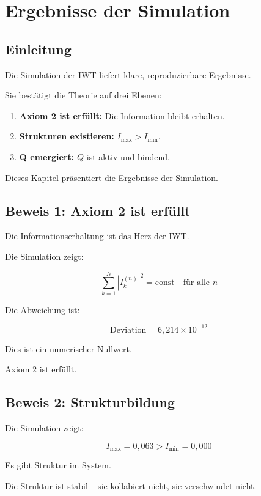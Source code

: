 \chapter{Ergebnisse der Simulation}

\section{Einleitung}

Die Simulation der IWT liefert klare, reproduzierbare Ergebnisse.

Sie bestätigt die Theorie auf drei Ebenen:

\begin{enumerate}
\item \textbf{Axiom 2 ist erfüllt:} Die Information bleibt erhalten.
\item \textbf{Strukturen existieren:} \( I_{\text{max}} > I_{\text{min}} \).
\item \textbf{Q emergiert:} \( Q \) ist aktiv und bindend.
\end{enumerate}

Dieses Kapitel präsentiert die Ergebnisse der Simulation.

\section{Beweis 1: Axiom 2 ist erfüllt}

Die Informationserhaltung ist das Herz der IWT.

Die Simulation zeigt:

\[
\sum_{k=1}^{N} |I_k^{(n)}|^2 = \text{const} \quad \text{für alle } n
\]

Die Abweichung ist:

\[
\text{Deviation} = 6,214 \times 10^{-12}
\]

Dies ist ein numerischer Nullwert.

Axiom 2 ist erfüllt.

\section{Beweis 2: Strukturbildung}

Die Simulation zeigt:

\[
I_{\text{max}} = 0,063 > I_{\text{min}} = 0,000
\]

Es gibt Struktur im System.

Die Struktur ist stabil – sie kollabiert nicht, sie verschwindet nicht.

